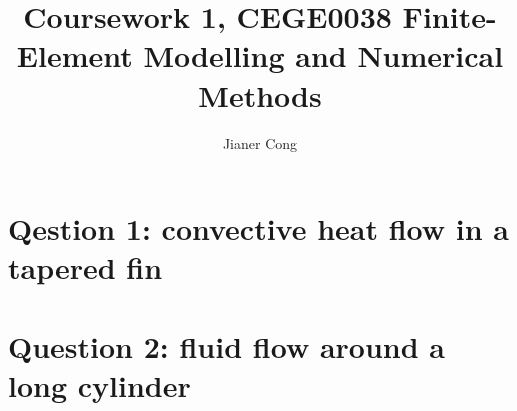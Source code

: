 \documentclass[fleqn,10pt,dvipsnames]{olplainarticle}
\title{Coursework 1, CEGE0038 Finite-Element Modelling and Numerical Methods}
\author[1]{Jianer Cong}
\affil[1]{zcesjco@ucl.ac.uk}
\begin{document}
\maketitle


\section*{Qestion 1: convective heat flow in a tapered fin}\label{sec:p1}

\section*{Question 2: fluid flow around a long cylinder}\label{sec:p2}



\end{document}
